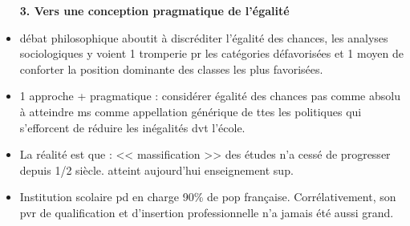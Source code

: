 \documentclass[12pt]{report}
\begin{document}
\begin{itemize}
\textbf{3. Vers une conception pragmatique de l'égalité}\\

\item débat philosophique aboutit à discréditer l'égalité des chances, les analyses sociologiques y voient 1 tromperie pr les catégories défavorisées et 1 moyen de conforter la position dominante des classes les plus favorisées. \\

\item 1 approche + pragmatique : considérer égalité des chances pas comme absolu à atteindre ms comme appellation générique de ttes les politiques qui s'efforcent de réduire les inégalités dvt l'école.\\

\item La réalité est que : << massification >> des études n'a cessé de progresser depuis 1/2 siècle. atteint aujourd'hui enseignement sup.


\vspace{0.5cm}


\item Institution scolaire pd en charge 90\% de pop française. Corrélativement, son pvr de qualification et d'insertion professionnelle n'a jamais été aussi grand.\\

\end{itemize}
\end{document}

